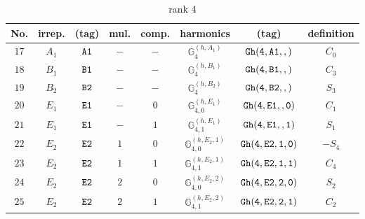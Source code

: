 \documentclass[fleqn,8pt]{jsarticle}
\begin{document}
\begin{table}[ht!]
\begin{center}
\caption{rank 4}
\renewcommand{\arraystretch}{1.3}
\begin{tabular}{cccccccc} \hline \hline
No. & irrep. & (tag) & mul. & comp. & harmonics & (tag) & definition \\ \hline
$ 17 $ & $ A_{1} $ & $ {\tt A1} $ & $ - $ & $ - $ & $ \mathbb{G}_{4}^{(h,A_{1})} $ & $ {\tt Gh(4,A1,,)} $ & $ C_{0} $ \\
$ 18 $ & $ B_{1} $ & $ {\tt B1} $ & $ - $ & $ - $ & $ \mathbb{G}_{4}^{(h,B_{1})} $ & $ {\tt Gh(4,B1,,)} $ & $ C_{3} $ \\
$ 19 $ & $ B_{2} $ & $ {\tt B2} $ & $ - $ & $ - $ & $ \mathbb{G}_{4}^{(h,B_{2})} $ & $ {\tt Gh(4,B2,,)} $ & $ S_{3} $ \\
$ 20 $ & $ E_{1} $ & $ {\tt E1} $ & $ - $ & $ 0 $ & $ \mathbb{G}_{4,0}^{(h,E_{1})} $ & $ {\tt Gh(4,E1,,0)} $ & $ C_{1} $ \\
$ 21 $ & $ E_{1} $ & $ {\tt E1} $ & $ - $ & $ 1 $ & $ \mathbb{G}_{4,1}^{(h,E_{1})} $ & $ {\tt Gh(4,E1,,1)} $ & $ S_{1} $ \\
$ 22 $ & $ E_{2} $ & $ {\tt E2} $ & $ 1 $ & $ 0 $ & $ \mathbb{G}_{4,0}^{(h,E_{2},1)} $ & $ {\tt Gh(4,E2,1,0)} $ & $ - S_{4} $ \\
$ 23 $ & $ E_{2} $ & $ {\tt E2} $ & $ 1 $ & $ 1 $ & $ \mathbb{G}_{4,1}^{(h,E_{2},1)} $ & $ {\tt Gh(4,E2,1,1)} $ & $ C_{4} $ \\
$ 24 $ & $ E_{2} $ & $ {\tt E2} $ & $ 2 $ & $ 0 $ & $ \mathbb{G}_{4,0}^{(h,E_{2},2)} $ & $ {\tt Gh(4,E2,2,0)} $ & $ S_{2} $ \\
$ 25 $ & $ E_{2} $ & $ {\tt E2} $ & $ 2 $ & $ 1 $ & $ \mathbb{G}_{4,1}^{(h,E_{2},2)} $ & $ {\tt Gh(4,E2,2,1)} $ & $ C_{2} $ \\
 \hline \hline
\end{tabular}
\end{center}
\end{table}
\end{document}

